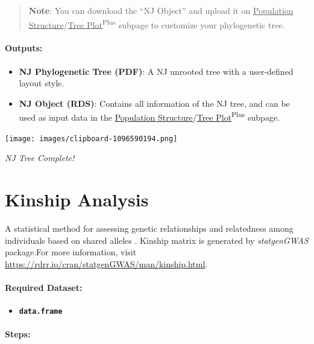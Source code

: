 \documentclass[
]{book}
\providecommand{\tightlist}{%
  \setlength{\itemsep}{0pt}\setlength{\parskip}{0pt}}
\begin{document}
\begin{quote}
\textbf{Note}: You can download the ``NJ Object'' and upload it on \ul{Population Structure}/\ul{Tree Plot}\textsuperscript{Plus} subpage to customize your phylogenetic tree.
\end{quote}

\paragraph*{Outputs:}\label{outputs-8}

\begin{itemize}
\item
  \textbf{NJ Phylogenetic Tree (PDF)}: A NJ unrooted tree with a user-defined layout style.
\item
  \textbf{NJ Object (RDS)}: Contains all information of the NJ tree, and can be used as input data in the \ul{Population Structure}/\ul{Tree Plot}\textsuperscript{Plus} subpage.
\end{itemize}

\texttt{[image: images/clipboard-1096590194.png]}

\emph{NJ Tree Complete!}

\section{Kinship Analysis}\label{kinship-analysis}

A statistical method for assessing genetic relationships and relatedness among individuals based on shared alleles \citep{kang2010}. Kinship matrix is generated by \emph{statgenGWAS} package.For more information, visit \url{https://rdrr.io/cran/statgenGWAS/man/kinship.html}.

\paragraph*{Required Dataset:}\label{required-dataset-5}

\begin{itemize}
\tightlist
\item
  {\textbf{\texttt{data.frame}}}
\end{itemize}

\paragraph*{\texorpdfstring{\textbf{Steps:}}{Steps:}}\label{steps-2}
\end{document}
